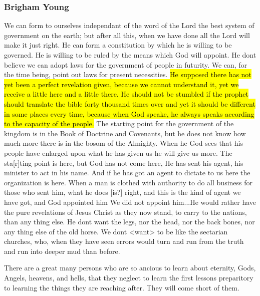	\subsubsection{Brigham Young} %
		\label{EPIST-REVELATIO 	N-BY}
	
		\begin{compactdesc}
		
			\item[18 April 1844, JSP-AR:119--121] We can form to ourselves independant of the word of the Lord the best system of government on the earth; but after all this, when we have done all the Lord will make it just right. He can form a constitution by which he is willing to be governed. He is willing to be ruled by the means which God will appoint. He dont believe we can adopt laws for the government of people in futurity. We can, for the time being, point out laws for present necessities. \hl{He supposed there has not yet been a perfect revelation given, because we cannot understand it, yet we receive a little here and a little there. He should not be stumbled if the prophet should translate the bible forty thousand times over and yet it should be different in some places every time, because when God speake, he always speaks according to the capacity of the people.} The starting point for the government of the kingdom is in the Book of Doctrine and Covenants, but he does not know how much more there is in the bosom of the Almighty. When \sout{he} God sees that his people have enlarged upon what he has given us he will give us more. The sta[r]ting point is here, but God has not come here, He has sent his agent, his minister to act in his name. And if he has got an agent to dictate to us here the organization is here. When a man is clothed with authority to do all business for those who sent him, what he does [is?] right, and this is the kind of agent we have got, and God appointed him We did not appoint him...He would rather have the pure revelations of Jesus Christ as they now stand, to carry to the nations, than any thing else. He dont want the legs, nor the head, nor the back bones, nor any thing else of the old horse. We dont <want> to be like the sectarian churches, who, when they have seen errors would turn and run from the truth and run into deeper mud than before.
			
			\item[8 October 1854, CR 100 317] There are a great many persons who are so ancious to learn about eternity, Gods, Angels, heavens, and hells, that they neglect to learn the first lessons preparitory to learning the things they are reaching after. They will come short of them.
		

\end{compactdesc}

